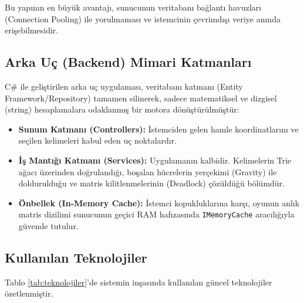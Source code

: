 \documentclass[conference,a4paper]{IEEEtran}
\begin{document}
Bu yapının en büyük avantajı, sunucunun veritabanı bağlantı havuzları (Connection Pooling) ile yorulmaması ve istemcinin çevrimdışı veriye anında erişebilmesidir.

\subsection{Arka Uç (Backend) Mimari Katmanları}
C\# ile geliştirilen arka uç uygulaması, veritabanı katmanı (Entity Framework/Repository) tamamen silinerek, sadece matematiksel ve dizgisel (string) hesaplamalara odaklanmış bir motora dönüştürülmüştür:
\begin{itemize}
    \item \textbf{Sunum Katmanı (Controllers):} İstemciden gelen hamle koordinatlarını ve seçilen kelimeleri kabul eden uç noktalardır.
    \item \textbf{İş Mantığı Katmanı (Services):} Uygulamanın kalbidir. Kelimelerin Trie ağacı üzerinden doğrulandığı, boşalan hücrelerin yerçekimi (Gravity) ile doldurulduğu ve matris kilitlenmelerinin (Deadlock) çözüldüğü bölümdür.
    \item \textbf{Önbellek (In-Memory Cache):} İstemci kopukluklarına karşı, oyunun anlık matris dizilimi sunucunun geçici RAM hafızasında \texttt{IMemoryCache} aracılığıyla güvende tutulur.
\end{itemize}

\subsection{Kullanılan Teknolojiler}
Tablo \ref{tab:teknolojiler}'de sistemin inşasında kullanılan güncel teknolojiler özetlenmiştir.

\begin{table}[H]
\centering
\caption{Projeye Entegre Edilen Teknolojiler ve Görevleri}
\label{tab:teknolojiler}
\end{table}
\end{document}
